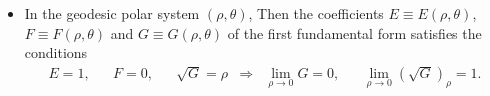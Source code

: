 \documentclass[11pt]{article}
\begin{document}
\begin{itemize}
\begin{proof}
Since 
\begin{align*}
\sqrt{E}\frac{du}{ds} & = \inn{\mb{x}_{u}\frac{du}{ds}}{\frac{\mb{x}_{u}}{\sqrt{E}}} \\
&= \inn{\mb{x}_{u}\frac{du}{ds}+ \mb{x}_{v}\frac{dv}{ds}}{\frac{\mb{x}_{u}}{\sqrt{E}}}\\
&= \inn{\dot{\alpha}(s)}{\frac{\mb{x}_{u}}{\sqrt{E}}} = \cos\phi
\end{align*}
and $\sqrt{G} \frac{dv}{ds} =  \inn{\dot{\alpha}(s)}{\frac{\mb{x}_{v}}{\sqrt{G}}} = \sin\phi$, we finally reach 
\begin{align*}
k_{g} &= (k_{g})_{1}\cos\phi + (k_{g})_{2}\sin\phi + \frac{d\phi}{ds}.
\end{align*}
This formula is called \emph{Liouville formula}. \QEDA 
\end{proof}

\item In the geodesic polar system $(\rho, \theta)$, Then the coefficients $E\equiv E(\rho, \theta)$, $F\equiv F(\rho, \theta)$ and $G\equiv G(\rho, \theta)$ of the first fundamental form satisfies the conditions
\begin{align}
E = 1, && F=0, && \sqrt{G}=\rho &\Rightarrow& \lim_{\rho \rightarrow 0}G = 0, && \lim_{\rho\rightarrow 0}(\sqrt{G})_{\rho} = 1. \label{eqn: Gauss_lemma}
\end{align}
\end{itemize}
\end{document}
